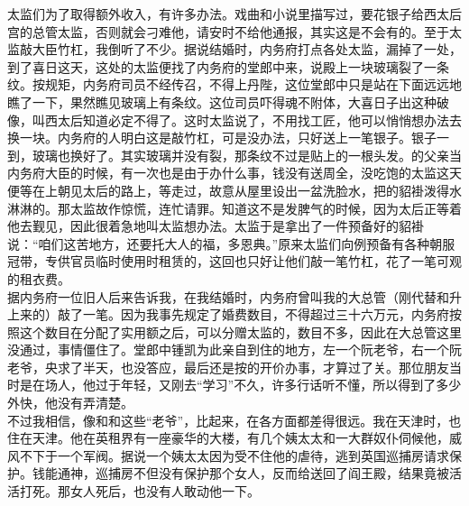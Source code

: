 太监们为了取得额外收入，有许多办法。戏曲和小说里描写过，要花银子给西太后宫的总管太监，否则就会刁难他，请安时不给他通报，其实这是不会有的。至于太监敲大臣竹杠，我倒听了不少。据说结婚时，内务府打点各处太监，漏掉了一处，到了喜日这天，这处的太监便找了内务府的堂郎中来，说殿上一块玻璃裂了一条纹。按规矩，内务府司员不经传召，不得上丹陛，这位堂郎中只是站在下面远远地瞧了一下，果然瞧见玻璃上有条纹。这位司员吓得魂不附体，大喜日子出这种破像，叫西太后知道必定不得了。这时太监说了，不用找工匠，他可以悄悄想办法去换一块。内务府的人明白这是敲竹杠，可是没办法，只好送上一笔银子。银子一到，玻璃也换好了。其实玻璃并没有裂，那条纹不过是贴上的一根头发。的父亲当内务府大臣的时候，有一次也是由于办什么事，钱没有送周全，没吃饱的太监这天便等在上朝见太后的路上，等走过，故意从屋里设出一盆洗脸水，把的貂褂泼得水淋淋的。那太监故作惊慌，连忙请罪。知道这不是发脾气的时候，因为太后正等着他去觐见，因此很着急地叫太监想办法。太监于是拿出了一件预备好的貂褂说：“咱们这苦地方，还要托大人的福，多恩典。”原来太监们向例预备有各种朝服冠带，专供官员临时使用时租赁的，这回也只好让他们敲一笔竹杠，花了一笔可观的租衣费。\\

据内务府一位旧人后来告诉我，在我结婚时，内务府曾叫我的大总管（刚代替和升上来的）敲了一笔。因为我事先规定了婚费数目，不得超过三十六万元，内务府按照这个数目在分配了实用额之后，可以分赠太监的，数目不多，因此在大总管这里没通过，事情僵住了。堂郎中锺凯为此亲自到住的地方，左一个阮老爷，右一个阮老爷，央求了半天，也没答应，最后还是按的开价办事，才算过了关。那位朋友当时是在场人，他过于年轻，又刚去“学习”不久，许多行话听不懂，所以得到了多少外快，他没有弄清楚。\\

不过我相信，像和和这些“老爷”，比起来，在各方面都差得很远。我在天津时，也住在天津。他在英租界有一座豪华的大楼，有几个姨太太和一大群奴仆伺候他，威风不下于一个军阀。据说一个姨太太因为受不住他的虐待，逃到英国巡捕房请求保护。钱能通神，巡捕房不但没有保护那个女人，反而给送回了阎王殿，结果竟被活活打死。那女人死后，也没有人敢动他一下。
